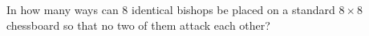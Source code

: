In how many ways can $8$ identical bishops be placed on a standard $8\times8$ chessboard so that no two of them attack each other?
